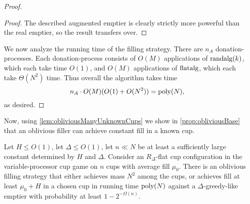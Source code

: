 \begin{proof}
\begin{proof}
  The described augmented emptier is clearly strictly more
  powerful than the real emptier, so the result transfers over.
\end{proof}

We now analyze the running time of the filling strategy.
There are $n_A$ donation-processes. Each donation-process
consists of $O(M)$ applications of $\operatorname{\text{\textup{randalg}}}(k)$, which each take
time $O(1)$, and $O(M)$
applications of $\operatorname{\text{\textup{flatalg}}}$, which each take $\Theta(N^2)$ time.
Thus overall the algorithm takes time
$$n_A \cdot O(M) (O(1) + O(N^2)) = \operatorname{\text{poly}}(N),$$
as desired.
  
\end{proof}

Now, using \cref{lem:obliviousManyUnknownCups} we show in
\cref{prop:obliviousBase} that an oblivious filler can achieve
constant fill in a known cup. 
\begin{proposition}
  \label{prop:obliviousBase}
  Let $H \le O(1)$, let $\Delta \le O(1)$, let $n\ll N$ be at least a
  sufficiently large constant determined by $H$ and $\Delta$. 
  Consider an $R_\Delta$-flat cup configuration in the variable-processor cup
  game on $n$ cups with average fill $\mu_0$.
  There is an oblivious filling strategy that either
  achieves mass $N^2$ among the cups, or achieves fill at least $\mu_0 + H$
  in a chosen cup in running time $\operatorname{\text{poly}}(N)$ against a
  $\Delta$-greedy-like emptier with probability at least $1-2^{-\Omega(n)}.$
\end{proposition}

